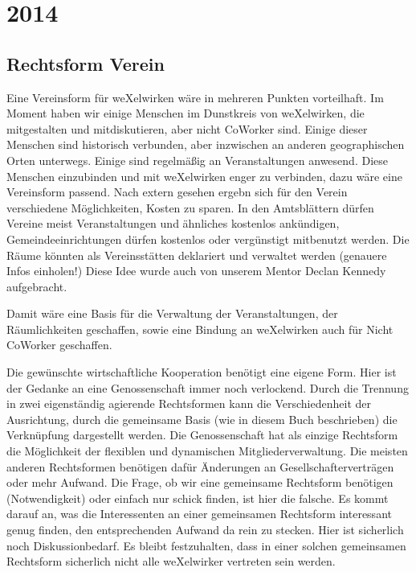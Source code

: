   \section{2014}
\subsection{Rechtsform Verein}
Eine Vereinsform für weXelwirken wäre in mehreren Punkten vorteilhaft.
%
Im Moment haben wir einige Menschen im Dunstkreis von weXelwirken, die mitgestalten und mitdiskutieren, aber nicht CoWorker sind.
%
Einige dieser Menschen sind historisch verbunden, aber inzwischen an anderen geographischen Orten unterwegs.
%
Einige sind regelmäßig an Veranstaltungen anwesend.
%
Diese Menschen einzubinden und mit weXelwirken enger zu verbinden, dazu wäre eine Vereinsform passend.
%
Nach extern gesehen ergebn sich für den Verein verschiedene Möglichkeiten, Kosten zu sparen.
%
In den Amtsblättern dürfen Vereine meist Veranstaltungen und ähnliches kostenlos ankündigen, Gemeindeeinrichtungen dürfen kostenlos oder vergünstigt mitbenutzt werden.
%
Die Räume könnten als Vereinsstätten deklariert und verwaltet werden (genauere Infos einholen!)
%
Diese Idee wurde auch von unserem Mentor Declan Kennedy aufgebracht.



Damit wäre eine Basis für die Verwaltung der Veranstaltungen, der Räumlichkeiten geschaffen, sowie eine Bindung an weXelwirken auch für Nicht CoWorker geschaffen.



Die gewünschte wirtschaftliche Kooperation benötigt eine eigene Form.
%
Hier ist der Gedanke an eine Genossenschaft immer noch verlockend.
%
Durch die Trennung in zwei eigenständig agierende Rechtsformen kann die Verschiedenheit der Ausrichtung, durch die gemeinsame Basis (wie in diesem Buch beschrieben) die Verknüpfung dargestellt werden.
%
Die Genossenschaft hat als einzige Rechtsform die Möglichkeit der flexiblen und dynamischen Mitgliederverwaltung.
%
Die meisten anderen Rechtsformen benötigen dafür Änderungen an Gesellschafterverträgen oder mehr Aufwand.
%
Die Frage, ob wir eine gemeinsame Rechtsform benötigen (Notwendigkeit) oder einfach nur schick finden, ist hier die falsche.
%
Es kommt darauf an, was die Interessenten an einer gemeinsamen Rechtsform interessant genug finden, den entsprechenden Aufwand da rein zu stecken.
%
Hier ist sicherlich noch Diskussionbedarf.
%
Es bleibt festzuhalten, dass in einer solchen gemeinsamen Rechtsform sicherlich nicht alle weXelwirker vertreten sein werden.
